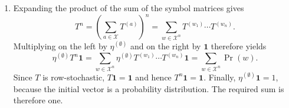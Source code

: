 \documentclass[11pt]{article}
\begin{document}
\begin{solution}[ex:p3-1]
\begin{enumerate}
\begin{enumerate}
            The word $010$ would require the path to emit a $0$ immediately
            after the transition $A\xrightarrow{1}B$, but state $B$ cannot
            emit $0$. Hence there is no such path. Equivalently,
            \[
              \eta^{(\emptyset)}T^{(0)}T^{(1)}T^{(0)}
                =\begin{bmatrix}0&0\end{bmatrix},
              \qquad
              \Pr(010)=0.
            \]
            This is the shortest example of an odd run of $1$s occurring
            between two $0$s, which the Even Process forbids.
        \end{enumerate}

      \item Expanding the product of the sum of the symbol matrices gives
        \[
          T^n
            =\left(\sum_{a\in\mathcal X}T^{(a)}\right)^n
            =\sum_{w\in\mathcal X^n}T^{(w_1)}\cdots T^{(w_n)}.
        \]
        Multiplying on the left by $\eta^{(\emptyset)}$ and on the right by
        $\mathbf 1$ therefore yields
        \[
          \eta^{(\emptyset)}T^n\mathbf 1
            =\sum_{w\in\mathcal X^n}
              \eta^{(\emptyset)}T^{(w_1)}\cdots T^{(w_n)}\mathbf 1
            =\sum_{w\in\mathcal X^n}\Pr(w).
        \]
        Since $T$ is row-stochastic, $T\mathbf 1=\mathbf 1$ and hence
        $T^n\mathbf 1=\mathbf 1$. Finally,
        $\eta^{(\emptyset)}\mathbf 1=1$, because the initial vector is a
        probability distribution. The required sum is therefore one.
    \end{enumerate}
\end{solution}
\end{document}
